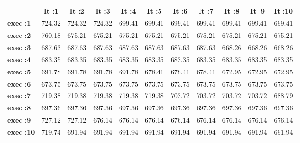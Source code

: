 \begin{tiny}\begin{tabular}{|l|c|c|c|c|c|c|c|c|c|c|}
\hline
&\textbf{It :1}&\textbf{It :2}&\textbf{It :3}&\textbf{It :4}&\textbf{It :5}&\textbf{It :6}&\textbf{It :7}&\textbf{It :8}&\textbf{It :9}&\textbf{It :10}\\\hline
\textbf{exec :1}&724.32&724.32&724.32&699.41&699.41&699.41&699.41&699.41&699.41&699.41\\\hline
\textbf{exec :2}&760.18&675.21&675.21&675.21&675.21&675.21&675.21&675.21&675.21&675.21\\\hline
\textbf{exec :3}&687.63&687.63&687.63&687.63&687.63&687.63&687.63&668.26&668.26&668.26\\\hline
\textbf{exec :4}&683.35&683.35&683.35&683.35&683.35&683.35&683.35&683.35&683.35&683.35\\\hline
\textbf{exec :5}&691.78&691.78&691.78&691.78&678.41&678.41&678.41&672.95&672.95&672.95\\\hline
\textbf{exec :6}&673.75&673.75&673.75&673.75&673.75&673.75&673.75&673.75&673.75&673.75\\\hline
\textbf{exec :7}&719.38&719.38&719.38&719.38&719.38&703.72&703.72&703.72&703.72&688.79\\\hline
\textbf{exec :8}&697.36&697.36&697.36&697.36&697.36&697.36&697.36&697.36&697.36&697.36\\\hline
\textbf{exec :9}&727.12&727.12&676.14&676.14&676.14&676.14&676.14&676.14&676.14&676.14\\\hline
\textbf{exec :10}&719.74&691.94&691.94&691.94&691.94&691.94&691.94&691.94&691.94&691.94\\\hline
\end{tabular}
\end{tiny}
